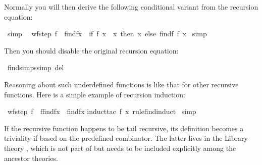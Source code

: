 \begin{isabellebody}
\begin{isamarkuptext}
Normally you will then derive the following conditional variant from
the recursion equation:%
\end{isamarkuptext}%
\isamarkuptrue%
\ {\isacharbrackleft}simp{\isacharbrackright}{\isacharcolon}\isanewline
\ \ {\isachardoublequote}wf{\isacharparenleft}step{}\ f{\isacharparenright}\ {\isasymLongrightarrow}\ find{\isacharparenleft}f{\isacharcomma}x{\isacharparenright}\ {\isacharequal}\ {\isacharparenleft}if\ f\ x\ {\isacharequal}\ x\ then\ x\ else\ find{\isacharparenleft}f{\isacharcomma}\ f\ x{\isacharparenright}{\isacharparenright}{\isachardoublequote}\isanewline
\isamarkupfalse%
\ simp\isamarkupfalse%
%
\begin{isamarkuptext}%
\noindent Then you should disable the original recursion equation:%
\end{isamarkuptext}%
\isamarkuptrue%
\ find{\isachardot}simps{\isacharbrackleft}simp\ del{\isacharbrackright}\isamarkupfalse%
%
\begin{isamarkuptext}%
Reasoning about such underdefined functions is like that for other
recursive functions.  Here is a simple example of recursion induction:%
\end{isamarkuptext}%
\isamarkuptrue%
\ {\isachardoublequote}wf{\isacharparenleft}step{}\ f{\isacharparenright}\ {\isasymlongrightarrow}\ f{\isacharparenleft}find{\isacharparenleft}f{\isacharcomma}x{\isacharparenright}{\isacharparenright}\ {\isacharequal}\ find{\isacharparenleft}f{\isacharcomma}x{\isacharparenright}{\isachardoublequote}\isanewline
\isamarkupfalse%
induct{\isacharunderscore}tac\ f\ x\ rule{\isacharcolon}find{\isachardot}induct{\isacharparenright}\isanewline
\isamarkupfalse%
\ simp\isanewline
\isamarkupfalse%
\isamarkupfalse%
%
\isamarkuptrue%
%
\begin{isamarkuptext}%
If the recursive function happens to be tail recursive, its
definition becomes a triviality if based on the predefined 
combinator.  The latter lives in the Library theory
, which is not part of  but needs to
be included explicitly among the ancestor theories.


\end{isamarkuptext}
\end{isabellebody}
